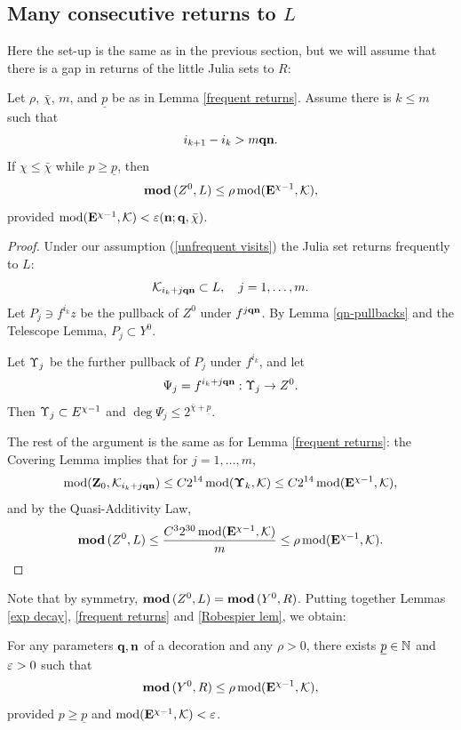 \subsection{Many consecutive returns to $L$}\label{Robespier}

Here the set-up is the same as in the previous section,
but we will assume that there is a gap in returns of the little Julia sets to $R$:


\begin{lem}\label{Robespier lem}
Let $\rho$,  $\bar\chi$, $m$, and $\underline p$ be as in Lemma \ref{frequent returns}.
Assume there is $k\leq m$ such that
\begin{equation}\label{unfrequent visits}
    i_{k+1}- i_k > m{\mathbf{q}}{\mathbf{n}} .
\end{equation}
If $\chi\leq \bar\chi$ while $p\geq \underline p$,
then
$$
  { \mathbf{mod}\, } (Z^0, L) \leq \rho \operatorname{mod}({\mathbf{E}}^{\chi-1}, {\mathcal K}),
$$
provided $\operatorname{mod}({\mathbf{E}}^{\chi-1}, {\mathcal K})< {\varepsilon}({\mathbf{n}}; {\mathbf{q}}, \bar\chi)$.
\end{lem}


\begin{proof}
Under our assumption (\ref{unfrequent visits})
the Julia set returns frequently to $L$:
$$
        {\mathcal K}_{i_k+ j {\mathbf{q}}{\mathbf{n}}} \subset L, \quad j=1,\dots, m.
$$
Let $P_j \ni f^{i_k}z $ be the pullback of $Z^0$ under $f^{j {\mathbf{q}}{\mathbf{n}}}$.
By Lemma \ref{qn-pullbacks} and the Telescope Lemma,
$P_j\subset Y^0$.

Let ${\Upsilon}_j$ be the further pullback of $P_j$ under $f^{i_k}$,
and let
$$
    \Psi_j= f^{i_k+j{\mathbf{q}}{\mathbf{n}}}: {\Upsilon}_j\rightarrow Z^0.
$$
Then ${\Upsilon}_j\subset E^{\chi-1}$ and $\deg \Psi_j\leq 2^{\bar\chi+\underline p}$.

The rest of the argument is the same as for Lemma \ref{frequent returns}:
the Covering Lemma implies that for $j=1,\dots, m$,
$$
    \operatorname{mod} ({\mathbf{Z}}_0, {\mathcal K}_{i_k+j{\mathbf{q}}{\mathbf{n}}}) \leq C 2^{14} \operatorname{mod}({\boldsymbol{\Upsilon}}_k, {\mathcal K})\leq  C 2^{14} \operatorname{mod}({\mathbf{E}}^{\chi-1}, {\mathcal K}) ,
$$
and by the Quasi-Additivity Law,
$$
  { \mathbf{mod}\, }(Z^0, L) \leq \frac{C^3 2^{30} \operatorname{mod}({\mathbf{E}}^{\chi-1}, {\mathcal K})}{m}\leq \rho \operatorname{mod}({\mathbf{E}}^{\chi-1}, {\mathcal K}).
$$
\end{proof}

Note that by symmetry, ${ \mathbf{mod}\, }(Z^0, L) = { \mathbf{mod}\, }(Y^0, R)$.
Putting together Lemmas \ref{exp decay}, \ref{frequent returns} and \ref{Robespier lem},
we obtain:

\begin{cor}\label{R-L dist}
For any parameters ${\mathbf{q}},{\mathbf{n}}$ of a decoration and any $\rho>0$,
 there exists  $\underline p \in {\Bbb N}$ and ${\varepsilon}>0$ such that
$$
  { \mathbf{mod}\, } (Y^0, R) \leq \rho \operatorname{mod}({\mathbf{E}}^{\chi-1}, {\mathcal K}),
$$
provided  $p\geq \underline p$ and $\operatorname{mod}({\mathbf{E}}^{\chi-1}, {\mathcal K})< {\varepsilon}$.
\end{cor}


